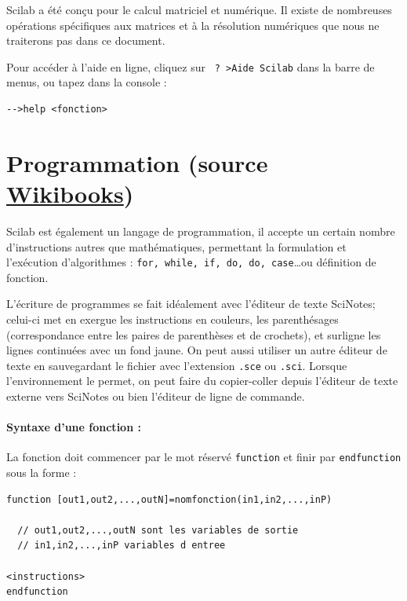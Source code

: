 Scilab a été conçu pour le calcul matriciel et numérique. 
Il existe de nombreuses opérations spécifiques aux matrices et à la résolution 
numériques que nous ne traiterons pas dans ce document.

Pour accéder à l'aide en ligne, cliquez sur \verb/ ? >Aide Scilab/ 
dans la barre de menus, ou tapez   dans la console :
\begin{code}
\begin{verbatim}
-->help <fonction>
\end{verbatim}
\end{code}

\section[Programmation]{Programmation (source \href{https://fr.wikibooks.org/wiki/Découvrir_Scilab}{Wikibooks}) }

Scilab est également un langage de programmation, il accepte un certain nombre 
d'instructions autres que mathématiques, permettant la formulation et l'exécution d'algorithmes : 
\verb?for, while, if, do, do, case?\ldots ou définition de fonction.

L'écriture de programmes se fait idéalement avec l'éditeur de 
texte SciNotes; celui-ci met en exergue les instructions en couleurs, 
les parenthésages (correspondance entre les paires de parenthèses 
et de crochets), et surligne les lignes continuées avec un fond jaune. 
On peut aussi utiliser un autre éditeur de texte en sauvegardant le fichier 
avec l'extension \verb?.sce? ou \verb?.sci?. Lorsque l'environnement le permet, on peut faire 
du copier-coller depuis l'éditeur de texte externe vers SciNotes 
ou bien l'éditeur de ligne de commande.

\paragraph{Syntaxe d'une fonction :}

La fonction doit commencer par le mot réservé \verb?function? et finir par \verb?endfunction? 
sous la forme :
\begin{code}
\begin{verbatim}
function [out1,out2,...,outN]=nomfonction(in1,in2,...,inP)

  // out1,out2,...,outN sont les variables de sortie
  // in1,in2,...,inP variables d entree
          
<instructions>
endfunction
\end{verbatim}
\end{code}

